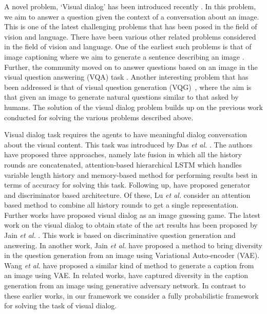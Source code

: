 \documentclass[review]{elsarticle}
\begin{document}
A novel problem, `Visual dialog' has been introduced recently \cite{Das_ICCV2017}. In this problem, we aim to answer a question given the context of a conversation about an image. This is one of the latest challenging problems that has been posed in the field of vision and language. 
There have been various other related problems considered in the field of vision and language. One of the earliest such problems is that of image captioning where we aim to generate a sentence describing an image \cite{Barnard_JMLR2003,Farhadi_ECCV2010,Kulkarni_CVPR2011,Socher_TACL2014,Vinyals_CVPR2015,Karpathy_CVPR2015,Fang_CVPR2015,Johnson_CVPR2016,Yan_ECCV2016}. Further, the community moved on to answer questions based on an image in the visual question answering (VQA) task \cite{Malinowski_NIPS2014,VQA,Ren_NIPS2015,Noh_CVPR2016,Xu_ECCV2016,Lu_NIPS2016,Shih_CVPR2016,Patro_CVPR2018dvqa,kim_NIPS2018bilinear,anderson_CVPR2018bottom,bai_ECCV2018deep,Ben_ICCV2017,zhang_ICLR2018learning}. Another interesting problem that has been addressed is that of visual question generation (VQG)~\cite{Mostafazadeh_ACL2016,jain_CVPR2017,patro_EMNLP2018multimodal,patro_COLING2018learning}, where the aim is that given an image to generate natural questions similar to that asked by humans. The solution of the visual dialog problem builds up on the previous work conducted for solving the various problems described above. 


Visual dialog task requires the agents to have meaningful dialog conversation about the visual content. This task was introduced by Das {\it et al.} \cite{Das_CVPR2017}. The authors have proposed three approaches, namely late fusion in which all the history rounds are concatenated, attention-based hierarchical LSTM which handles variable length history and memory-based method for performing results best in terms of accuracy for solving this task. Following up, \cite{lu2017best,wu_CVPR2018} have proposed generator and discriminator based architecture. Of these, Lu {\it et al.} \cite{lu2017best} consider an attention based method to combine all history rounds to get a single representation. Further works \cite{de2017guesswhat,strub2017end,Das_ICCV2017} have proposed visual dialog as an image guessing game. The latest work on the visual dialog to obtain state of the art results has been proposed by  Jain {\it et al.} \cite{jain2018two}. This work is based on discriminative question generation and answering.  In another work, Jain {\it et al.} \cite{jain_CVPR2017} have proposed a method to bring diversity in the question generation from an image using Variational Auto-encoder (VAE). Wang {\it et al.} \cite{wang_NIPS2017diverse} have proposed a similar kind of method to generate a caption from an image using VAE. In related works, \cite{dai_ICCV2017towards, li_arxiv2018generating} have captured diversity in the caption generation from an image using generative adversary network.  In contrast to these earlier works, in our framework we consider a fully probabilistic framework for solving the task of visual dialog. 
\end{document}
